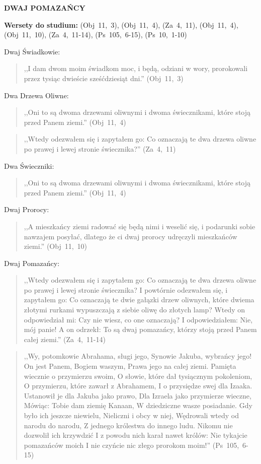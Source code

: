 \documentclass[10pt,a4paper,oneside]{article}
\begin{document}
\centerline{\textbf{\MakeUppercase{Dwaj Pomazańcy}}}
\begin{center}
\textbf{Wersety do studium:} \mbox{(Obj 11, 3)}, \mbox{(Obj 11, 4)}, \mbox{(Za 4, 11)}, \mbox{(Obj 11, 4)}, \mbox{(Obj 11, 10)}, \mbox{(Za 4, 11-14)}, \mbox{(Ps 105, 6-15)}, \mbox{(Ps 10, 1-10)}
\end{center}
Dwaj Świadkowie:
\begin{quote}
,,I dam dwom moim świadkom moc, i będą, odziani w wory, prorokowali przez tysiąc dwieście sześćdziesiąt dni.'' \mbox{(Obj 11, 3)}
\end{quote}
Dwa Drzewa Oliwne:
\begin{quote}
,,Oni to są dwoma drzewami oliwnymi i dwoma świecznikami, które stoją przed Panem ziemi.'' \mbox{(Obj 11, 4)}
\end{quote}
\begin{quote}
,,Wtedy odezwałem się i zapytałem go: Co oznaczają te dwa drzewa oliwne po prawej i lewej stronie świecznika?'' \mbox{(Za 4, 11)}
\end{quote}
Dwa Świeczniki:
\begin{quote}
,,Oni to są dwoma drzewami oliwnymi i dwoma świecznikami, które stoją przed Panem ziemi.'' \mbox{(Obj 11, 4)}
\end{quote}
Dwaj Prorocy:
\begin{quote}
,,A mieszkańcy ziemi radować się będą nimi i weselić się, i podarunki sobie nawzajem posyłać, dlatego że ci dwaj prorocy udręczyli mieszkańców ziemi.'' \mbox{(Obj 11, 10)}
\end{quote}
Dwaj Pomazańcy:
\begin{quote}
,,Wtedy odezwałem się i zapytałem go: Co oznaczają te dwa drzewa oliwne po prawej i lewej stronie świecznika? I powtórnie odezwałem się, i zapytałem go: Co oznaczają te dwie gałązki drzew oliwnych, które dwiema złotymi rurkami wypuszczają z siebie oliwę do złotych lamp? Wtedy on odpowiedział mi: Czy nie wiesz, co one oznaczają? I odpowiedziałem: Nie, mój panie! A on odrzekł: To są dwaj pomazańcy, którzy stoją przed Panem całej ziemi.'' \mbox{(Za 4, 11-14)}
\end{quote}
\begin{quote}
,,Wy, potomkowie Abrahama, sługi jego, Synowie Jakuba, wybrańcy jego! On jest Panem, Bogiem waszym, Prawa jego na całej ziemi. Pamięta wiecznie o przymierzu swoim, O słowie, które dał tysiącznym pokoleniom, O przymierzu, które zawarł z Abrahamem, I o przysiędze swej dla Izaaka. Ustanowił je dla Jakuba jako prawo, Dla Izraela jako przymierze wieczne, Mówiąc: Tobie dam ziemię Kanaan, W dziedziczne wasze posiadanie. Gdy było ich jeszcze niewielu, Nieliczni i obcy w niej, Wędrowali wtedy od narodu do narodu, Z jednego królestwa do innego ludu. Nikomu nie dozwolił ich krzywdzić I z powodu nich karał nawet królów: Nie tykajcie pomazańców moich I nie czyńcie nic złego prorokom moim!'' \mbox{(Ps 105, 6-15)}
\end{quote}
\end{document}
